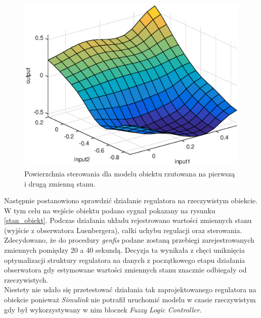 
\begin{figure}[h!]
	\centering
	\includegraphics[scale = 0.8]{fig/fuzzy_hel_model_surf.eps}
	\caption		
	{Powierzchnia sterowania dla modelu obiektu rzutowana na pierwszą i drugą zmienną stanu.}
	\label{fuzzy_hel_model_surf}
\end{figure} 
\FloatBarrier
Następnie postanowiono sprawdzić działanie regulatora na rzeczywistym obiekcie. W tym celu na wejście obiektu podano sygnał pokazany na rysunku \ref{stan_obiekt}. Podczas działania układu rejestrowano wartości zmiennych stanu (wyjście z obserwatora Luenbergera), całki uchybu regulacji oraz sterowania.\\
Zdecydowano, że do procedury \textit{genfis} podane zostaną przebiegi zarejestrowanych zmiennych pomiędzy 20 a 40 sekundą. Decyzja ta wynikała z chęci uniknięcia optymalizacji struktury regulatora na danych z początkowego etapu działania obserwatora gdy estymowane wartości zmiennych stanu znacznie odbiegały od rzeczywistych. \\
Niestety nie udało się przetestować działania tak zaprojektowanego regulatora na obiekcie ponieważ \textit{Simulink} nie potrafił uruchomić modelu w czasie rzeczywistym gdy był wykorzystywany w nim bloczek  \textit{Fuzzy Logic Controller}. \\
